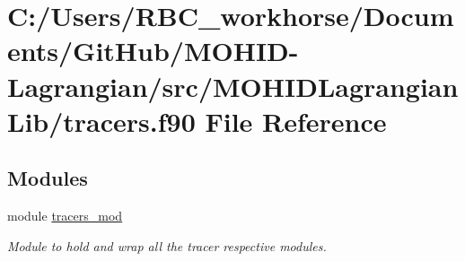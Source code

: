 \hypertarget{tracers_8f90}{}\section{C\+:/\+Users/\+R\+B\+C\+\_\+workhorse/\+Documents/\+Git\+Hub/\+M\+O\+H\+I\+D-\/\+Lagrangian/src/\+M\+O\+H\+I\+D\+Lagrangian\+Lib/tracers.f90 File Reference}
\label{tracers_8f90}
\subsection*{Modules}
\begin{DoxyCompactItemize}
\item 
module \mbox{\hyperlink{namespacetracers__mod}{tracers\+\_\+mod}}
\begin{DoxyCompactList}\small\item\em Module to hold and \textquotesingle{}wrap\textquotesingle{} all the tracer respective modules. \end{DoxyCompactList}\end{DoxyCompactItemize}
